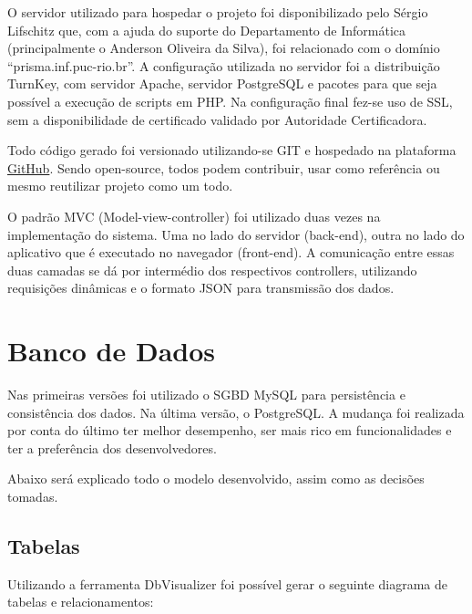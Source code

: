 \documentclass[graduacao,brazil]{ThesisPUC}
\begin{document}
O servidor utilizado para hospedar o projeto foi disponibilizado pelo Sérgio Lifschitz que, com a ajuda do suporte do Departamento de Informática (principalmente o Anderson Oliveira da Silva), foi relacionado com o domínio “prisma.inf.puc-rio.br”. A configuração utilizada no servidor foi a distribuição TurnKey, com servidor Apache, servidor PostgreSQL e pacotes para que seja possível a execução de scripts em PHP. Na configuração final fez-se uso de SSL, sem a disponibilidade de certificado validado por Autoridade Certificadora.

Todo código gerado foi versionado utilizando-se GIT e hospedado na plataforma \href{https://github.com/PrismaDev/prisma}{GitHub}. Sendo open-source, todos podem contribuir, usar como referência ou mesmo reutilizar projeto como um todo.

O padrão MVC (Model-view-controller) foi utilizado duas vezes na implementação do sistema. Uma no lado do servidor (back-end), outra no lado do aplicativo que é executado no navegador (front-end). A comunicação entre essas duas camadas se dá por intermédio dos respectivos controllers, utilizando requisições dinâmicas e o formato JSON para transmissão dos dados.

\section{Banco de Dados}

Nas primeiras versões foi utilizado o SGBD MySQL para persistência e consistência dos dados. Na última versão, o PostgreSQL. A mudança foi realizada por conta do último ter melhor desempenho, ser mais rico em funcionalidades e ter a preferência dos desenvolvedores.

Abaixo será explicado todo o modelo desenvolvido, assim como as decisões tomadas.

\subsection{Tabelas}

Utilizando a ferramenta DbVisualizer foi possível gerar o seguinte diagrama de tabelas e relacionamentos:
\end{document}
